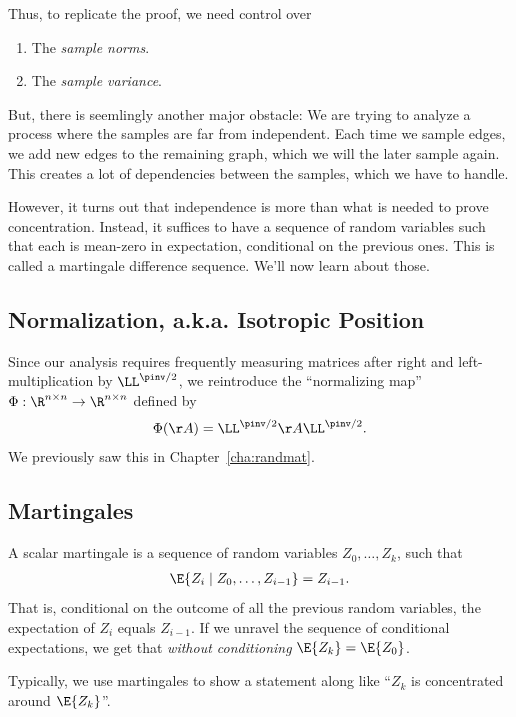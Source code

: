 Thus, to replicate the proof, we need control over
\begin{enumerate}
\item The \emph{sample norms}.
\item The \emph{sample variance}.

\end{enumerate}

But, there is seemlingly another major obstacle: We are trying to
analyze a process where the samples are far from independent.
Each time we sample edges, we add new edges to the remaining graph,
which we will the later sample again. This creates a lot of
dependencies between the samples, which we have to handle.

However, it turns out that independence is more than what is needed to
prove concentration. Instead, it suffices to have a sequence of random
variables such that each is mean-zero in expectation, conditional on
the previous ones. This is called a martingale difference sequence.
We'll now learn about those.

\subsection{Normalization, a.k.a. Isotropic Position}

Since our analysis requires frequently measuring matrices after right
and left-multiplication by $\LL^{\pinv/2}$, we reintroduce the
``normalizing map'' $\Phi : \R^{n\times n} \to
\R^{n\times n} $
defined by
\[
  \Phi(\AA) = \LL^{\pinv/2}\AA\LL^{\pinv/2}.
  \]
We previously saw this in Chapter~\ref{cha:randmat}.

\subsection{Martingales}

A scalar martingale is a sequence of random variables $Z_0, \ldots,
Z_k$, such that
\begin{align}
\label{eq:martingale}
  \E{Z_i \mid Z_0, \ldots, Z_{i-1}} = Z_{i-1}
.
\end{align}
That is, conditional on the outcome of all the previous random
variables, the expectation of $Z_{i}$ equals $Z_{i-1}$.
If we unravel the sequence of conditional expectations, we
get that \emph{without conditioning}
$\E{Z_k}=\E{Z_0}$.

Typically, we use martingales to show a statement along like  ``$Z_k$
is concentrated around $\E{Z_k}$''.

